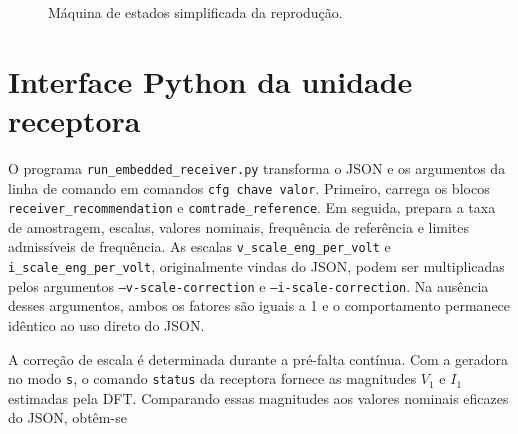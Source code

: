 \begin{figure}[H]
  \centering
  \caption{Máquina de estados simplificada da reprodução.}
  \label{fig:estados-reproducao}
\end{figure}

\section{Interface Python da unidade receptora}

O programa \texttt{run\_embedded\_receiver.py} transforma o JSON e os argumentos da linha de comando em comandos \texttt{cfg chave valor}. Primeiro, carrega os blocos \texttt{receiver\_recommendation} e \texttt{comtrade\_reference}. Em seguida, prepara a taxa de amostragem, escalas, valores nominais, frequência de referência e limites admissíveis de frequência. As escalas \texttt{v\_scale\_eng\_per\_volt} e \texttt{i\_scale\_eng\_per\_volt}, originalmente vindas do JSON, podem ser multiplicadas pelos argumentos \texttt{--v-scale-correction} e \texttt{--i-scale-correction}. Na ausência desses argumentos, ambos os fatores são iguais a 1 e o comportamento permanece idêntico ao uso direto do JSON.

A correção de escala é determinada durante a pré-falta contínua. Com a geradora no modo \texttt{s}, o comando \texttt{status} da receptora fornece as magnitudes $V_1$ e $I_1$ estimadas pela DFT. Comparando essas magnitudes aos valores nominais eficazes do JSON, obtêm-se


